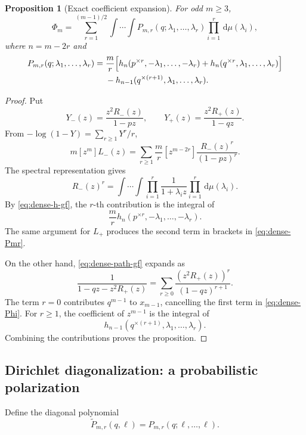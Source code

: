 \documentclass[11pt]{article}
\newtheorem{proposition}[theorem]{Proposition}
\newcommand{\dd}{\,\mathrm d}
\begin{document}
\begin{proposition}[Exact coefficient expansion]\label{prop:dense-expansion}
For odd \(m\ge3\),
\begin{equation}\label{eq:dense-expansion}
 \Phi_m=\sum_{r=1}^{(m-1)/2}
 \int\!\cdots\!\int
 P_{m,r}(q;\lambda_1,\ldots,\lambda_r)
 \prod_{i=1}^r\dd\mu(\lambda_i),
\end{equation}
where \(n=m-2r\) and
\begin{align}
 P_{m,r}(q;\lambda_1,\ldots,\lambda_r)
 ={}&\frac mr\Bigl[
 h_n(p^{\times r},-\lambda_1,\ldots,-\lambda_r)
 +h_n(q^{\times r},\lambda_1,\ldots,\lambda_r)
 \Bigr]\notag\\
 &-h_{n-1}(q^{\times(r+1)},\lambda_1,\ldots,\lambda_r).
 \label{eq:dense-Pmr}
\end{align}
\end{proposition}

\begin{proof}
Put
\[
       Y_-(z)=\frac{z^2R_-(z)}{1-pz},
       \qquad
       Y_+(z)=\frac{z^2R_+(z)}{1-qz}.
\]
From \(-\log(1-Y)=\sum_{r\ge1}Y^r/r\),
\[
 m[z^m]L_-(z)
 =\sum_{r\ge1}\frac mr
   [z^{m-2r}]\frac{R_-(z)^r}{(1-pz)^r}.
\]
The spectral representation gives
\[
 R_-(z)^r
 =\int\!\cdots\!\int
   \prod_{i=1}^r\frac1{1+\lambda_i z}
   \prod_{i=1}^r\dd\mu(\lambda_i).
\]
By \eqref{eq:dense-h-gf}, the \(r\)-th contribution is the integral of
\[
       \frac mr h_n(p^{\times r},-\lambda_1,\ldots,-\lambda_r).
\]
The same argument for \(L_+\) produces the second term in brackets in
\eqref{eq:dense-Pmr}.

On the other hand, \eqref{eq:dense-path-gf} expands as
\[
 \frac1{1-qz-z^2R_+(z)}
 =\sum_{r\ge0}\frac{(z^2R_+(z))^r}{(1-qz)^{r+1}}.
\]
The term \(r=0\) contributes \(q^{m-1}\) to \(x_{m-1}\), cancelling the
first term in \eqref{eq:dense-Phi}.  For \(r\ge1\), the coefficient of
\(z^{m-1}\) is the integral of
\[
       h_{n-1}(q^{\times(r+1)},\lambda_1,\ldots,\lambda_r).
\]
Combining the contributions proves the proposition.
\end{proof}

\subsection{Dirichlet diagonalization: a probabilistic polarization}

Define the diagonal polynomial
\begin{equation}\label{eq:dense-Ptilde}
       \widetilde P_{m,r}(q,\ell)
       =P_{m,r}(q;\ell,\ldots,\ell).
\end{equation}
\end{document}
